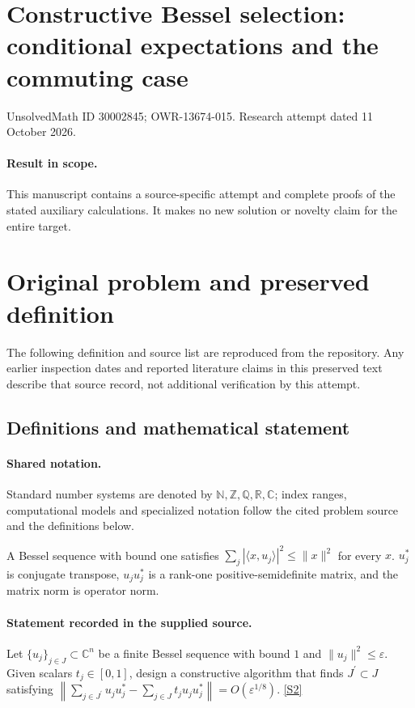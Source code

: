\documentclass[11pt]{article}
\begin{document}
\section*{Constructive Bessel selection: conditional expectations and the commuting case}
\noindent UnsolvedMath ID 30002845; OWR-13674-015. Research attempt dated 11 October 2026.
\paragraph{Result in scope.}This manuscript contains a source-specific attempt and complete proofs of the stated auxiliary calculations. It makes no new solution or novelty claim for the entire target.
\section{Original problem and preserved definition}
The following definition and source list are reproduced from the repository. Any earlier inspection dates and reported literature claims in this preserved text describe that source record, not additional verification by this attempt.
\subsection{Definitions and mathematical statement}

\paragraph{Shared notation.}Standard number systems are denoted by $\mathbb N,\mathbb Z,\mathbb Q,\mathbb R,\mathbb C$; index ranges, computational models and specialized notation follow the cited problem source and the definitions below.


A Bessel sequence with bound one satisfies $\sum_j|\langle x,u_j\rangle|^2\leq\lVert x\rVert^2$ for every $x$. $u_j^*$ is conjugate transpose, $u_ju_j^*$ is a rank-one positive-semidefinite matrix, and the matrix norm is operator norm.
\paragraph{Statement recorded in the supplied source.}
Let $\{u_j\}_{j\in J}\subset\mathbb{C}^n$ be a finite Bessel sequence with bound $1$ and $\lVert u_j\rVert^2\leq\varepsilon$. Given scalars $t_j\in[0,1]$, design a constructive algorithm that finds $J^\prime\subset J$ satisfying $\left\lVert\sum_{j\in J^\prime}u_ju_j^*-\sum_{j\in J}t_ju_ju_j^*\right\rVert=O(\varepsilon^{1/8})$. \href{https://doi.org/10.4171/owr/2015/17}{[S2]}
\end{document}
